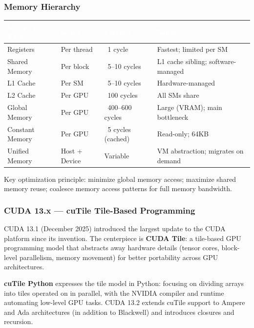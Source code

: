 \documentclass[11pt,letterpaper]{article}
\newcommand{\tableheader}[1]{\textbf{\sffamily\textcolor{white}{#1}}}
\begin{document}
\subsubsection{Memory Hierarchy}

\begin{center}
\begin{tabularx}{\textwidth}{L{3cm}L{2.5cm}L{2.5cm}X}
\toprule
{}
\tableheader{Memory Type} & \tableheader{Scope} & \tableheader{Latency} & \tableheader{Notes} \\
\midrule
Registers & Per thread & ~1 cycle & Fastest; limited per SM \\
Shared Memory & Per block & ~5--10 cycles & L1 cache sibling; software-managed \\
L1 Cache & Per SM & ~5--10 cycles & Hardware-managed \\
L2 Cache & Per GPU & ~100 cycles & All SMs share \\
Global Memory & Per GPU & ~400--600 cycles & Large (VRAM); main bottleneck \\
Constant Memory & Per GPU & ~5 cycles (cached) & Read-only; 64KB \\
Unified Memory & Host + Device & Variable & VM abstraction; migrates on demand \\
\bottomrule
\end{tabularx}
\end{center}

Key optimization principle: minimize global memory access; maximize shared memory reuse; coalesce memory access patterns for full memory bandwidth.

\subsubsection{CUDA 13.x --- cuTile Tile-Based Programming}

CUDA 13.1 (December 2025) introduced the largest update to the CUDA platform since its invention. The centerpiece is \textbf{CUDA Tile}: a tile-based GPU programming model that abstracts away hardware details (tensor cores, block-level parallelism, memory movement) for better portability across GPU architectures.

\textbf{cuTile Python} expresses the tile model in Python: focusing on dividing arrays into tiles operated on in parallel, with the NVIDIA compiler and runtime automating low-level GPU tasks. CUDA 13.2 extends cuTile support to Ampere and Ada architectures (in addition to Blackwell) and introduces closures and recursion.
\end{document}
